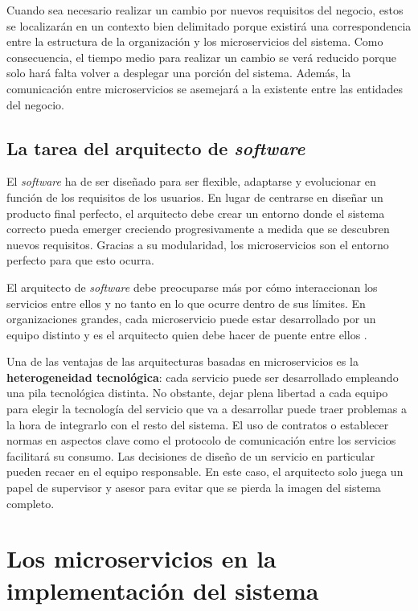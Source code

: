 \documentclass[11pt,spanish,listoffigures]{tfgetsinf}
\begin{document}
Cuando sea necesario realizar un cambio por nuevos requisitos del negocio, estos se localizarán en un contexto bien delimitado porque existirá una correspondencia entre la estructura de la organización y los microservicios del sistema. Como consecuencia, el tiempo medio para realizar un cambio se verá reducido porque solo hará falta volver a desplegar una porción del sistema. Además, la comunicación entre microservicios se asemejará a la existente entre las entidades del negocio.

\subsection{La tarea del arquitecto de \textit{software}}

El \textit{software} ha de ser diseñado para ser flexible, adaptarse y evolucionar en función de los requisitos de los usuarios. En lugar de centrarse en diseñar un producto final perfecto, el arquitecto debe crear un entorno donde el sistema correcto pueda emerger creciendo progresivamente a medida que se descubren nuevos requisitos. Gracias a su modularidad, los microservicios son el entorno perfecto para que esto ocurra.

El arquitecto de \textit{software} debe preocuparse más por cómo interaccionan los servicios entre ellos y no tanto en lo que ocurre dentro de sus límites. En organizaciones grandes, cada microservicio puede estar desarrollado por un equipo distinto y es el arquitecto quien debe hacer de puente entre ellos \cite{Newman2015a}.

Una de las ventajas de las arquitecturas basadas en microservicios es la \textbf{heterogeneidad tecnol\'ogica}: cada servicio puede ser desarrollado empleando una pila tecnológica distinta. No obstante, dejar plena libertad a cada equipo para elegir la tecnología del servicio que va a desarrollar puede traer problemas a la hora de integrarlo con el resto del sistema. El uso de contratos o establecer normas en aspectos clave como el protocolo de comunicación entre los servicios facilitará su consumo. Las decisiones de diseño de un servicio en particular pueden recaer en el equipo responsable. En este caso, el arquitecto solo juega un papel de supervisor y asesor para evitar que se pierda la imagen del sistema completo.

\section{Los microservicios en la implementaci\'on del sistema}
\end{document}
